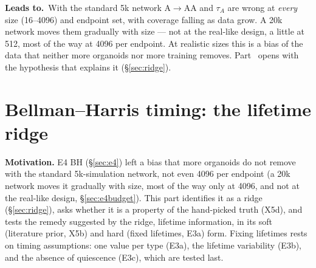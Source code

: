 \documentclass[10pt,a4paper]{article}
\newcommand{\tA}{$\tau_A$}
\newcommand{\Leads}[1]{\begin{leadbox}{\sffamily\bfseries\color{caqua!70!black}Leads to.}\ #1\end{leadbox}}
\newcommand{\partintro}[1]{\begin{keybox}#1\end{keybox}}
\newcommand{\sref}[1]{\S\ref{#1}}
\begin{document}
\Leads{With the standard 5k network A$\to$AA and \tA{} are wrong at \emph{every} size (16--4096) and endpoint set, with coverage falling as data grow. A 20k network moves them gradually with size --- not at the real-like design, a little at 512, most of the way at 4096 per endpoint. At realistic sizes this is a bias of the data that neither more organoids nor more training removes. Part~\ref{part:timing} opens with the hypothesis that explains it (\sref{sec:ridge}).}

\clearpage
\part{Bellman--Harris timing: the lifetime ridge}\label{part:timing}
\partintro{\textbf{Motivation.} E4 BH (\sref{sec:e4}) left a bias that more organoids do not remove with the standard 5k-simulation network, not even 4096 per endpoint (a 20k network moves it gradually with size, most of the way only at 4096, and not at the real-like design, \sref{sec:e4budget}). This part identifies it as a ridge (\sref{sec:ridge}), asks whether it is a property of the hand-picked truth (X5d), and tests the remedy suggested by the ridge, lifetime information, in its soft (literature prior, X5b) and hard (fixed lifetimes, E3a) form. Fixing lifetimes rests on timing assumptions: one value per type (E3a), the lifetime variability (E3b), and the absence of quiescence (E3c), which are tested last.}
\end{document}
